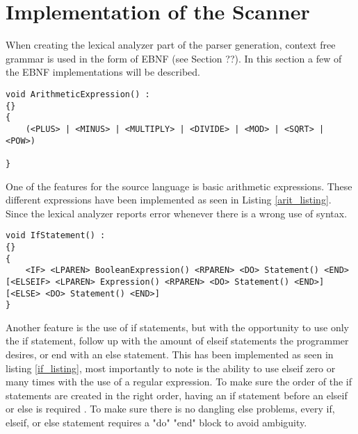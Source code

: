 \section{Implementation of the Scanner}
When creating the lexical analyzer part of the parser generation, context free grammar is used in the form of EBNF (see Section ??). In this section a few of the EBNF implementations will be described.
\begin{lstlisting}[label=arit_listing]
void ArithmeticExpression() :
{}
{
	(<PLUS> | <MINUS> | <MULTIPLY> | <DIVIDE> | <MOD> | <SQRT> | <POW>)

}

\end{lstlisting}
One of the features for the source language is basic arithmetic expressions. These different expressions have been implemented as seen in Listing \ref{arit_listing}. Since the lexical analyzer reports error whenever there is a wrong use of syntax.


\begin{lstlisting}[label=if_listing]
void IfStatement() :
{}
{
    <IF> <LPAREN> BooleanExpression() <RPAREN> <DO> Statement() <END> [<ELSEIF> <LPAREN> Expression() <RPAREN> <DO> Statement() <END>] [<ELSE> <DO> Statement() <END>]
}
\end{lstlisting}
Another feature is the use of if statements, but with the opportunity to use only the if statement, follow up with the amount of elseif statements the programmer desires, or end with an else statement. This has been implemented as seen in listing \ref{if_listing}, most importantly to note is the ability to use elseif zero or many times with the use of a regular expression. To make sure the order of the if statements are created in the right order, having an if statement before an elseif or else is required . To make sure there is no dangling else problems, every if, elseif, or else statement requires a "do" "end" block to avoid ambiguity.